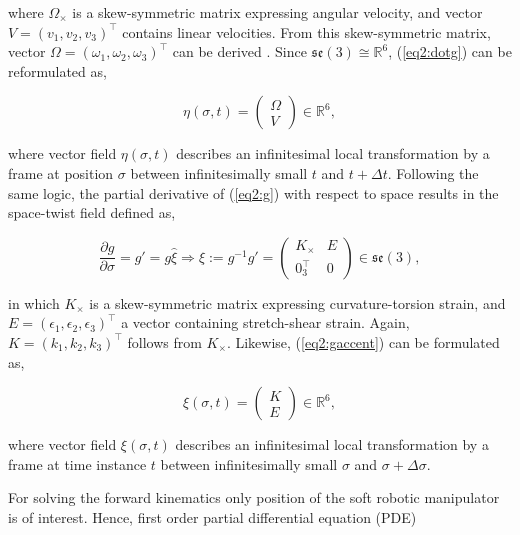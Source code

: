 where $\Omega_\times$ is a skew-symmetric matrix expressing angular velocity, and vector $V = (v_1,v_2,v_3)^\top $ contains linear velocities. From this skew-symmetric matrix, vector $\Omega = (\omega_1,\omega_2,\omega_3)^\top$ can be derived \cite{Sola2018}. Since $\mathfrak{se}(3) \cong \mathbb{R}^6$, (\ref{eq2:dotg}) can be reformulated as,

\begin{equation}
    \eta(\sigma,t) = \begin{pmatrix} \Omega \\ V \end{pmatrix} \in \mathbb{R}^6,
\end{equation}

where vector field $\eta(\sigma,t)$ describes an infinitesimal local transformation by a frame at position $\sigma$ between infinitesimally small $t$ and $t+\Delta t$. Following the same logic, the partial derivative of (\ref{eq2:g}) with respect to space results in the space-twist field defined as,

\begin{equation}
   \frac{\partial g}{\partial \sigma} =  g' = g\hat{\xi} \Longrightarrow \hat{\xi} := g^{-1}g' = \begin{pmatrix} K_\times & E \\ 0_3^\top & 0 \end{pmatrix} \in  \mathfrak{se}(3),
    \label{eq2:gaccent}
\end{equation}

in which $K_\times$ is a skew-symmetric matrix expressing curvature-torsion strain, and $E = (\epsilon_1,\epsilon_2,\epsilon_3)^\top$ a vector containing stretch-shear strain. Again,  $K = (k_1,k_2,k_3)^\top$ follows from $K_\times$. Likewise, (\ref{eq2:gaccent}) can be formulated as,


\begin{equation}
    \xi(\sigma,t) = \begin{pmatrix} K \\ E \end{pmatrix} \in \mathbb{R}^6,
    \label{eq2:etaxi}
\end{equation}

where vector field $\xi(\sigma,t)$ describes an infinitesimal local transformation by a frame at time instance $t$ between infinitesimally small $\sigma$ and $\sigma+\Delta \sigma$.



For solving the forward kinematics only position of the soft robotic manipulator is of interest. Hence, first order partial differential equation (PDE)

